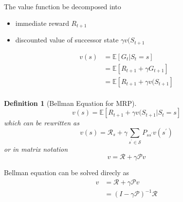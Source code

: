 \documentclass[a4paper,10pt]{article}
\newtheorem{defn}{Definition}
\begin{document}
The value function be decomposed into
\begin{itemize}
 \item immediate reward $R_{t+1}$
 \item discounted value of successor state $\gamma v(S_{t+1}$
\end{itemize}

\begin{align*}
v(s) &= \mathbb{E} \left[ G_t | S_t = s \right] \\
&= \mathbb{E} \left[ R_{t+1} + \gamma G_{t+1} \right] \\
&= \mathbb{E} \left[ R_{t+1} + \gamma v(S_{t+1} \right] \\
\end{align*}

\begin{defn}[Bellman Equation for MRP]
 $$
 v(s) = \mathbb{E} \left[ R_{t+1} + \gamma v(S_{t+1} | S_t = s \right]
 $$
 which can be rewritten as
 $$
 v(s) = \mathcal{R}_s + \gamma \sum_{s^\prime \in \mathcal{S}} P_{s s^\prime} v(s^\prime)
 $$
 or in matrix notation
 $$
 v = \mathcal{R} + \gamma \mathcal{P} v
 $$
\end{defn}


Bellman equation can be solved direcly as
\begin{align*}
 v &= \mathcal{R} + \gamma \mathcal{P} v \\
   &= (I - \gamma \mathcal{P})^{-1} \mathcal{R}
\end{align*}
\end{document}
